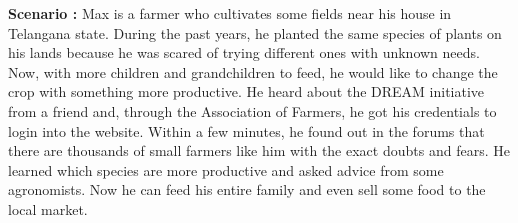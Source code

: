 \begin{flushleft}
\textbf{Scenario :} 
Max is a farmer who cultivates some fields near his house in Telangana state. During the past years, he planted the same species of plants on his lands because he was scared of trying different ones with unknown needs. Now, with more children and grandchildren to feed, he would like to change the crop with something more productive. 
He heard about the DREAM initiative from a friend and, through the Association of Farmers, he got his credentials to login into the website.
Within a few minutes, he found out in the forums that there are thousands of small farmers like him with the exact doubts and fears.
He learned which species are more productive and asked advice from some agronomists.
Now he can feed his entire family and even sell some food to the local market.
\end{flushleft}
